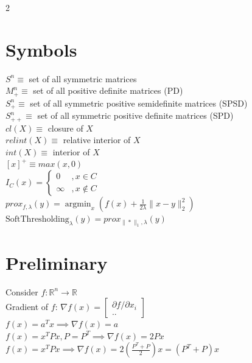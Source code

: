 \documentclass[8pt]{extarticle}
\DeclareMathOperator*{\argmin}{argmin}
\newcommand{\R}{\mathbb{R}}
\newcommand{\norm}[1]{\|#1\|}
\begin{document}

\begin{multicols*}{2}

  \section{Symbols}

  $S^n \equiv$ set of all symmetric matrices\\
  
  $M_+^n \equiv$ set of all positive definite matrices (PD)\\
  
  $S_+^n \equiv$ set of all symmetric positive semidefinite matrices (SPSD)\\
  
  $S_{++}^n \equiv$ set of all symmetric positive definite matrices (SPD)\\
  
  $cl(X) \equiv$ closure of $X$\\

  $relint(X) \equiv$ relative interior of $X$\\
  
  $int(X) \equiv$ interior of $X$\\

  $[x]^+ \equiv max(x,0)$\\

  $I_C(x) = \begin{cases}
      0 &, x \in C\\
      \infty &, x \not\in C
    \end{cases}$\\
   
  $prox_{f,\lambda}(y) = \argmin_x (f(x)+\frac{1}{2 \lambda}\norm{x-y}_2^2)$\\
    
  $\text{SoftThresholding}_{\lambda}(y) = prox_{\norm{*}_1,\lambda}(y)$

  \vfill\null
  \columnbreak
  \vfill\null
  \columnbreak
  
  \section{Preliminary}
  
  Consider $f:\R^n \to \R$\\
  Gradient of $f$: $\nabla f(x) = \begin{bmatrix} \partial f / \partial x_i \\ .. \end{bmatrix}$\\
  $f(x) = a^Tx \implies \nabla f(x) = a$\\
  $f(x) = x^TPx, P=P^T \implies \nabla f(x) = 2Px$\\
  $f(x) = x^TPx \implies \nabla f(x) = 2(\frac{P^T+P}{2})x=(P^T+P)x$\\


\end{multicols*}
\end{document}
